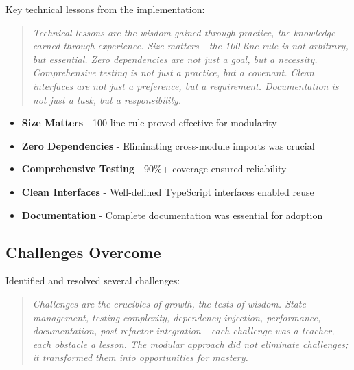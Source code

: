\documentclass[11pt]{article}
\begin{document}
Key technical lessons from the implementation:

\begin{quote}
\emph{Technical lessons are the wisdom gained through practice, the knowledge earned through experience. Size matters - the 100-line rule is not arbitrary, but essential. Zero dependencies are not just a goal, but a necessity. Comprehensive testing is not just a practice, but a covenant. Clean interfaces are not just a preference, but a requirement. Documentation is not just a task, but a responsibility.}
\end{quote}

\begin{itemize}
\item \textbf{Size Matters} - 100-line rule proved effective for modularity
\item \textbf{Zero Dependencies} - Eliminating cross-module imports was crucial
\item \textbf{Comprehensive Testing} - 90\%+ coverage ensured reliability
\item \textbf{Clean Interfaces} - Well-defined TypeScript interfaces enabled reuse
\item \textbf{Documentation} - Complete documentation was essential for adoption
\end{itemize}

\subsection{Challenges Overcome}

Identified and resolved several challenges:

\begin{quote}
\emph{Challenges are the crucibles of growth, the tests of wisdom. State management, testing complexity, dependency injection, performance, documentation, post-refactor integration - each challenge was a teacher, each obstacle a lesson. The modular approach did not eliminate challenges; it transformed them into opportunities for mastery.}
\end{quote}
\end{document}
